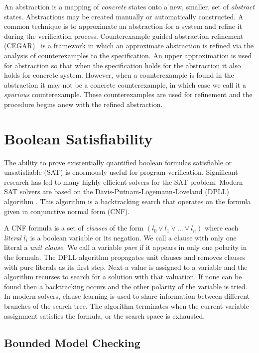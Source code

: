 An abstraction is a mapping of \emph{concrete} states onto a new, smaller, set of  \emph{abstract} states. Abstractions may be created manually or automatically constructed. A common technique is to approximate an abstraction for a system and refine it during the verification process. Counterexample guided abstraction refinement (CEGAR)~\cite{Clarke00} is a framework in which an approximate abstraction is refined via the analysis of counterexamples to the specification. An upper approximation is used for abstraction so that when the specification holds for the abstraction it also holds for concrete system. However, when a counterexample is found in the abstraction it may not be a concrete counterexample, in which case we call it a \emph{spurious} counterexample. These counterexamples are used for refinement and the procedure begins anew with the refined abstraction.

\section{Boolean Satisfiability}

The ability to prove existentially quantified boolean formulas satisfiable or
unsatisfiable (SAT) is enormously useful for program verification. Significant
research has led to many highly efficient solvers for the SAT problem. Modern
SAT solvers are based on the Davis-Putnam-Logemann-Loveland (DPLL) algorithm
\cite{Davis60, Davis62}. This algorithm is a backtracking search that operates
on the formula given in conjunctive normal form (CNF).

A CNF formula is a set of \emph{clauses} of the form $(l_0 \lor l_1 \lor ...
\lor l_n)$ where each \emph{literal} $l_i$ is a boolean variable or its
negation. We call a clause with only one literal a \emph{unit clause}. We call
a variable \emph{pure} if it appears in only one polarity in the formula. The
DPLL algorithm propagates unit clauses and removes clauses with pure literals
as its first step. Next a value is assigned to a variable and the algorithm recurses to search for a solution with that valuation. If none can be found then a backtracking occurs and the other polarity of the variable is tried. In modern solvers, clause learning is used to share information between different branches of the search tree. The algorithm terminates when the current variable assignment satisfies the formula, or the search space is exhausted.

\subsection{Bounded Model Checking}
\label{sec:boundedmodelchecking}

